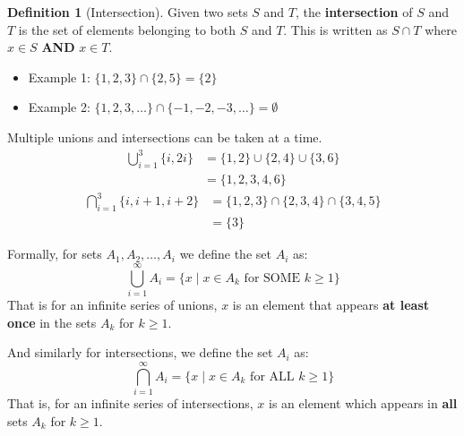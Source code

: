 \documentclass[12pt]{article}
\theoremstyle{definition}
\newtheorem{definition}{Definition}
\begin{document}
            \begin{definition}[Intersection]
                \label{def:intersection}
                Given two sets $S$ and $T$, the \textbf{intersection} of $S$ and $T$ is the set of elements belonging to
                both $S$ and $T$. This is written as $S \cap T$ where $x \in S$ \textbf{AND} $x \in T$.
            \end{definition}
            \begin{itemize}
                \item Example 1: $\{1,2,3\} \cap \{2,5\} = \{2\}$
                \item Example 2: $\{1,2,3,\dots\} \cap \{-1,-2,-3,\dots\} = \emptyset$ \\
            \end{itemize}

            Multiple unions and intersections can be taken at a time.
            \begin{align*}
                \displaystyle\bigcup_{i=1}^{3} \{i, 2i\} &= \{1,2\} \cup \{2,4\} \cup \{3,6\} \\
                &= \{1,2,3,4,6\}
            \end{align*}
            \begin{align*}
                \displaystyle\bigcap_{i=1}^{3} \{i, i+1, i+2\} &= \{1,2,3\} \cap \{2,3,4\} \cap \{3,4,5\} \\
                &=\{3\}
            \end{align*}
            
            Formally, for sets $A_1,A_2,\dots,A_i$ we define the set $A_i$ as:
            \begin{equation*}
                \displaystyle\bigcup_{i=1}^{\infty} A_i = \{x \mid x \in A_{k} \text{ for SOME } k \ge 1\}
            \end{equation*}
            That is for an infinite series of unions, $x$ is an element that appears \textbf{at least once} 
            in the sets $A_k$ for $k \ge 1$.

            And similarly for intersections, we define the set $A_i$ as:
            \begin{equation*}
                \displaystyle\bigcap_{i=1}^{\infty} A_i = \{x \mid x \in A_{k} \text{ for ALL } k \ge 1\}
            \end{equation*}
            That is, for an infinite series of intersections, $x$ is an element which appears in \textbf{all} 
            sets $A_k$ for $k \ge 1$.
\end{document}
